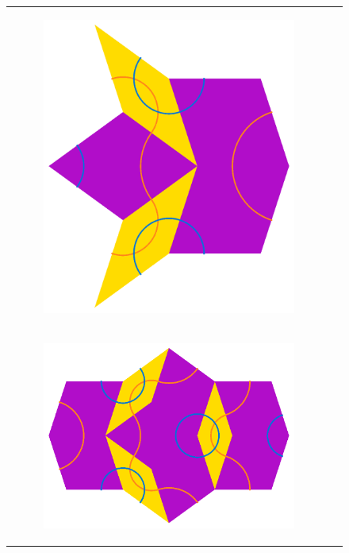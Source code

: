 \documentclass[]{article}
\begin{document}
\begin{figure}[H]
\begin{tabular}{cc}
\begin{subfigure}[b]{0.4\textwidth}
             \includegraphics[scale=0.4]{FatInflation1}
             \end{subfigure}   \\
	       	 \begin{subfigure}[b]{0.4\textwidth}
             \centering
             \includegraphics[scale=0.4]{FatInflation2}

\end{subfigure}
\end{tabular}
\end{figure}
\end{document}
